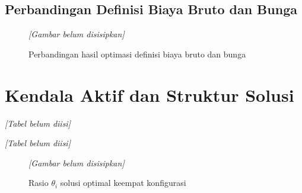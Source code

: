         \subsection{Perbandingan Definisi Biaya Bruto dan Bunga}\label{subsec:cost definitions}

        \begin{figure}[H]
            \centering
            \textit{[Gambar belum disisipkan]}
            \caption{Perbandingan hasil optimasi definisi biaya bruto dan bunga}\label{fig:cost definitions}
        \end{figure}

    \section{Kendala Aktif dan Struktur Solusi}\label{sec:active constraints}

        \begin{table}[H]
            \centering
            \caption{Status kendala aktif dan vertex kotak-simpleks per konfigurasi}\label{tab:active constraints}
            \textit{[Tabel belum diisi]}
        \end{table}

        \begin{table}[H]
            \centering
            \caption{Slack kendala $J_{\text{MCCaR}}$ per algoritma}\label{tab:slack}
            \textit{[Tabel belum diisi]}
        \end{table}

        \begin{figure}[H]
            \centering
            \textit{[Gambar belum disisipkan]}
            \caption{Rasio $\theta_i$ solusi optimal keempat konfigurasi}\label{fig:theta ratio}
        \end{figure}

